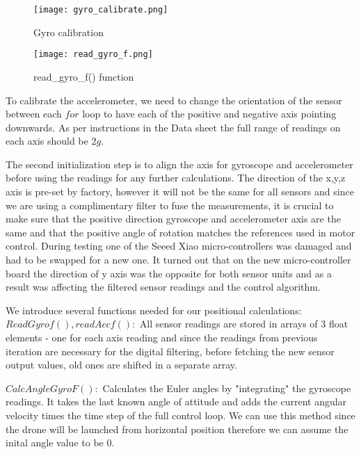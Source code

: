 \documentclass{article}
\begin{document}
\begin{flushleft}
\begin{figure}[H]
    \begin{center}
    \texttt{[image: gyro\_calibrate.png]}
    \end{center}
    \caption{Gyro calibration}
    \label{fig:my_label}
\end{figure}

\begin{figure}[H]
    \begin{center}
    \texttt{[image: read\_gyro\_f.png]}
    \end{center}
    \caption{read_gyro_f() function}
    \label{fig:my_label}
\end{figure}

\begin{flushleft}
To calibrate the accelerometer, we need to change the orientation of the sensor between each $for$ loop to have each of the positive and negative axis pointing downwards. As per instructions in the Data sheet the full range of readings on each axis should be 2$g$. 

The second initialization step is to align the axis for gyroscope and accelerometer before using the readings for any further calculations.
The direction of the x,y,z axis is pre-set by factory, however it will not be the same for all sensors and since we are using a complimentary filter to fuse the measurements, it is crucial to make sure that the positive direction gyroscope and accelerometer axis are the same and that the positive angle of rotation matches the references used in motor control. \newline
During testing one of the Seeed Xiao micro-controllers was damaged and had to be swapped for a new one. It turned out that on the new micro-controller board the direction of y axis was the opposite for both sensor units and as a result was affecting the filtered sensor readings and the control algorithm. \newline

We introduce several functions needed for our positional calculations:
$ReadGyrof(), readAccf():$\newline
All sensor readings are stored in arrays of 3 float elements - one for each axis reading and since the readings from previous iteration are necessary for the digital filtering, before fetching the new sensor output values, old ones are shifted in a separate array.

$CalcAngleGyroF():$\newline
Calculates the Euler angles by "integrating" the gyroscope readings. It takes the last known angle of attitude and adds the current angular velocity times the time step of the full control loop. We can use this method since the drone will be launched from horizontal position therefore we can assume the inital angle value to be 0.


\end{flushleft}
\end{flushleft}
\end{document}

